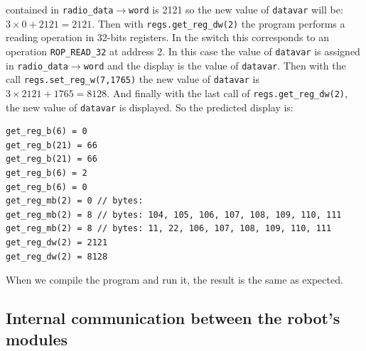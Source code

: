 \documentclass[11pt]{article}
\begin{document}
contained in \texttt{radio\_data}${\rightarrow}$\texttt{word} is 2121 so the new value of \texttt{datavar} will be: ${3\times0 + 2121 = 2121}$. Then with \texttt{regs.get\_reg\_dw(2)} the program performs a reading operation in 32-bits registers. In the switch this corresponds to an operation \texttt{ROP\_READ\_32} at address 2. In this case the value of \texttt{datavar} is assigned in \texttt{radio\_data}${\rightarrow}$\texttt{word} and the display is the value of \texttt{datavar}. Then with the call \texttt{regs.set\_reg\_w(7,1765)} the new value of \texttt{datavar} is ${3\times2121 + 1765 = 8128}$. And finally with the last call of \texttt{regs.get\_reg\_dw(2)}, the new value of \texttt{datavar} is displayed. So the predicted display is:


\begin{verbatim}
get_reg_b(6) = 0
get_reg_b(21) = 66
get_reg_b(21) = 66
get_reg_b(6) = 2
get_reg_b(6) = 0
get_reg_mb(2) = 0 // bytes:
get_reg_mb(2) = 8 // bytes: 104, 105, 106, 107, 108, 109, 110, 111
get_reg_mb(2) = 8 // bytes: 11, 22, 106, 107, 108, 109, 110, 111
get_reg_dw(2) = 2121
get_reg_dw(2) = 8128
\end{verbatim}

When we compile the program and run it, the result is the same as expected.

\subsection{Internal communication between the robot's modules}
\end{document}
